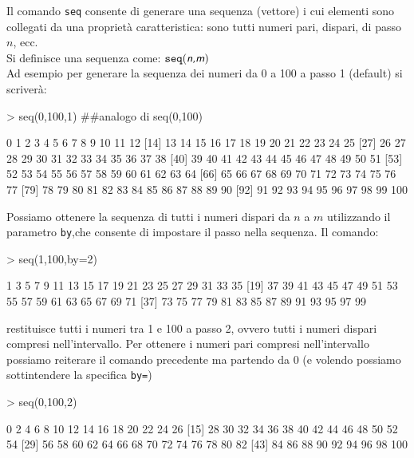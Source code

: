 \documentclass[onecolumn,11pt]{book}
\newcommand{\varia}[1]{\textsl{\textsf{#1}}}
\begin{document}
Il comando \texttt{seq} consente di generare una sequenza (vettore) i cui elementi sono collegati da una propriet\`a caratteristica: sono tutti numeri pari, dispari, di passo $n$, ecc.\\
Si definisce una sequenza come: $\texttt{seq}(\varia{n,m})$\\ %
Ad esempio per generare la sequenza dei numeri da 0 a 100 a passo 1 (default) si scriver\`a:
\begin{Schunk}
\begin{Sinput}
> seq(0,100,1) ##analogo di seq(0,100)
\end{Sinput}
\begin{Soutput}
  [1]   0   1   2   3   4   5   6   7   8   9  10  11  12
 [14]  13  14  15  16  17  18  19  20  21  22  23  24  25
 [27]  26  27  28  29  30  31  32  33  34  35  36  37  38
 [40]  39  40  41  42  43  44  45  46  47  48  49  50  51
 [53]  52  53  54  55  56  57  58  59  60  61  62  63  64
 [66]  65  66  67  68  69  70  71  72  73  74  75  76  77
 [79]  78  79  80  81  82  83  84  85  86  87  88  89  90
 [92]  91  92  93  94  95  96  97  98  99 100
\end{Soutput}
\end{Schunk}
Possiamo ottenere la sequenza di tutti i numeri dispari da $n$ a $m$ utilizzando il parametro \texttt{by},che consente di impostare il passo nella sequenza.
Il comando:  
\begin{Schunk}
\begin{Sinput}
> seq(1,100,by=2)
\end{Sinput}
\begin{Soutput}
 [1]  1  3  5  7  9 11 13 15 17 19 21 23 25 27 29 31 33 35
[19] 37 39 41 43 45 47 49 51 53 55 57 59 61 63 65 67 69 71
[37] 73 75 77 79 81 83 85 87 89 91 93 95 97 99
\end{Soutput}
\end{Schunk}
restituisce tutti i numeri tra 1 e 100 a passo 2, ovvero tutti i numeri dispari compresi nell'intervallo. 
Per ottenere i numeri pari compresi nell'intervallo possiamo reiterare il comando precedente ma partendo da 0 (e volendo possiamo sottintendere la specifica \texttt{by=})
\begin{Schunk}
\begin{Sinput}
> seq(0,100,2)
\end{Sinput}
\begin{Soutput}
 [1]   0   2   4   6   8  10  12  14  16  18  20  22  24  26
[15]  28  30  32  34  36  38  40  42  44  46  48  50  52  54
[29]  56  58  60  62  64  66  68  70  72  74  76  78  80  82
[43]  84  86  88  90  92  94  96  98 100
\end{Soutput}
\end{Schunk}
\end{document}

